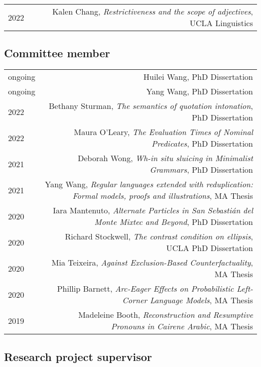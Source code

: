 \documentclass[12pt]{article}
\begin{document}
\begin{longtable}{LR}
  2022    & Kalen Chang, \textit{Restrictiveness and the scope of adjectives},
            UCLA Linguistics
\end{longtable}

\subsection*{Committee member}

\begin{longtable}{LR}
  ongoing & Huilei Wang, PhD Dissertation\\
  ongoing & Yang Wang, PhD Dissertation\\
  2022    & Bethany Sturman, \textit{The semantics of quotation intonation},
            PhD Dissertation\\
  2022    & Maura O'Leary, \textit{The Evaluation Times of Nominal Predicates},
            PhD Dissertation\\
  2021    & Deborah Wong, \textit{Wh-in situ sluicing in Minimalist Grammars},
            PhD Dissertation\\
  2021    & Yang Wang, \textit{Regular languages extended with reduplication:
            Formal models, proofs and illustrations}, MA Thesis\\
  2020    & Iara Mantenuto, \textit{Alternate Particles in San Sebasti\'{a}n del
            Monte Mixtec and Beyond}, PhD Dissertation\\
  2020    & Richard Stockwell, \textit{The contrast condition on ellipsis}, UCLA
            PhD Dissertation\\
  2020    & Mia Teixeira, \textit{Against Exclusion-Based Counterfactuality},
            MA Thesis\\
  2020    & Phillip Barnett, \textit{Arc-Eager Effects on Probabilistic
            Left-Corner Language Models}, MA Thesis\\
  2019    & Madeleine Booth, \textit{Reconstruction and Resumptive Pronouns in
            Cairene Arabic}, MA Thesis
\end{longtable}

\subsection*{Research project supervisor}
\end{document}
